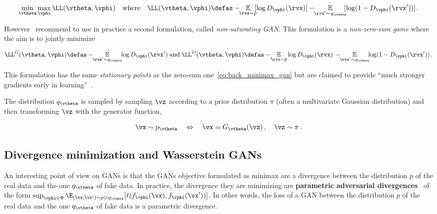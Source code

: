 \begin{equation}\label{eq:back_minimax_gan}
\min_{\vtheta} \max_{\vphi} \LL(\vtheta,\vphi)
\quad \text{where} \quad
\LL(\vtheta,\vphi) \defas - \!\!\underset{\rvx \sim p}{\mathbb E} \!\![ \log D_\vphi(\rvx)] - \!\!\underset{\rvx' \sim q_\vtheta}{\mathbb E} \!\![\log (1- D_\vphi(\rvx'))] \,. 
\end{equation}

However~\citet{goodfellow2014generative} recommend to use in practice a second formulation, called \emph{non-saturating GAN}. This formulation is a \emph{non-zero-sum game} where the aim is to jointly minimize

\begin{equation}\label{eq:back_non_saturating_objective}
\LL^{G}(\vtheta,\vphi) \defas - \!\!\underset{\rvx' \sim q_{\vtheta}}{\mathbb E} \!\! \log D_\vphi(\rvx')
\; \text{and} \;
\LL^{D}(\vtheta,\vphi) \defas - \!\underset{\rvx \sim p}{\mathbb E} \log D_\vphi(\rvx) \,- \!\!\underset{\rvx' \sim q_\vtheta}{\mathbb E} \!\!\log (1- D_\vphi(\rvx')) \,. 
\end{equation}

This formulation has the same \emph{stationary points} as the zero-sum one~\eqref{eq:back_minimax_gan} but are claimed to provide ``much stronger gradients early in learning''~\citep{goodfellow2014generative}.




The distribution $q_\vtheta$ is sampled by sampling $\vz$ according to a prior distribution $\pi$ (often a multivariate Gaussian distribution) and then transforming $\vz$ with the generator function,

\begin{equation}
\vx \sim p_\vtheta \quad \Leftrightarrow \quad \vx = G_\vtheta(\vz) \,,\quad \vz \sim \pi \,.
\end{equation}




\subsection{Divergence minimization and Wasserstein GANs}




An interesting point of view on GANs is that the GANs objective formulated as minimax are a divergence between the distribution $p$ of the real data and the one $q_\vtheta$ of fake data. In practice, the divergence they are minimizing are \textbf{parametric adversarial divergences}~\citep{huang2017parametric} of the form $\sup_{\vphi \in\Phi} \E_{(\vx,\vx')\sim p\otimes {q_\vtheta}}[\ell(f_\vphi(\vx), f_\vphi(\vx'))]$. In other words, the loss of a GAN between the distribution $p$ of the real data and the one $q_\vtheta$ of fake data is a parametric divergence. 




